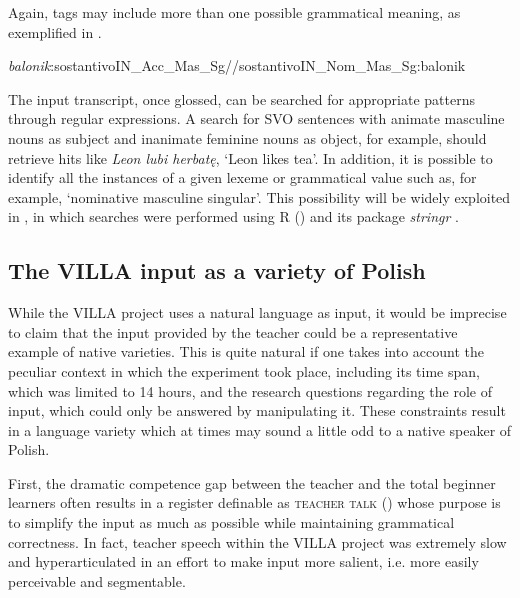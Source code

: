 Again, tags may include more than one possible grammatical meaning, as exemplified in .

\ea%
    \label{ex:02:1}
    \ttfamily\small
    \textit{balonik}:sostantivoIN\_Acc\_Mas\_Sg//sostantivoIN\_Nom\_Mas\_Sg:balonik
    \z

The input transcript, once glossed, can be searched for appropriate patterns through regular expressions. A search for SVO sentences with animate masculine nouns as subject and inanimate feminine nouns as object, for example, should retrieve hits like \textit{Leon lubi herbatę}, ‘Leon likes tea’. In addition, it is possible to identify all the instances of a given lexeme or grammatical value such as, for example, ‘nominative masculine singular’. This possibility will be widely exploited in , in which searches were performed using R (\citealt{RCoreTeam2017}) and its package \textit{stringr} \citep{Wickham2017}.

\subsection{The VILLA input as a variety of Polish}\label{sec:02:1.3}

While the VILLA project uses a natural language as input, it would be imprecise to claim that the input provided by the teacher could be a representative example of native varieties. This is quite natural if one takes into account the peculiar context in which the experiment took place, including its time span, which was limited to 14 hours, and the research questions regarding the role of input, which could only be answered by manipulating it. These constraints result in a language variety which at times may sound a little odd to a native speaker of Polish. 

First, the dramatic competence gap between the teacher and the total beginner learners often results in a register definable as \textsc{teacher talk} (\citealt[134—144]{Larsen-FreemanLong1991}) whose purpose is to simplify the input as much as possible while maintaining grammatical correctness. In fact, teacher speech within the VILLA project was extremely slow and hyperarticulated in an effort to make input more salient, i.e. more easily perceivable and segmentable. 

